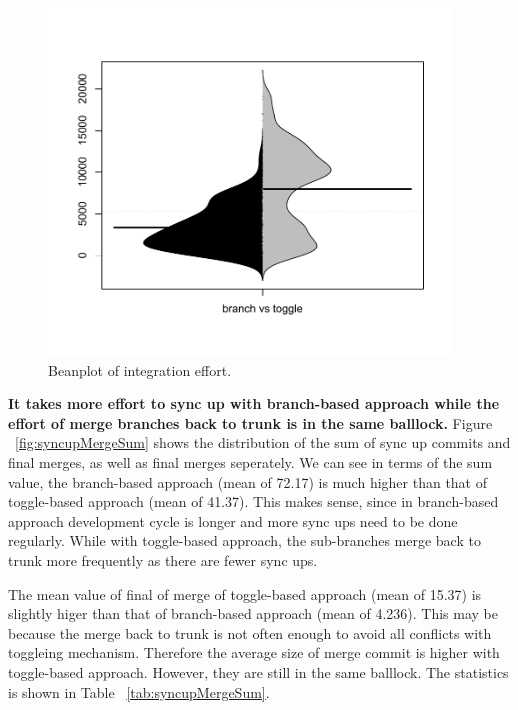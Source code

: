 \begin{figure}
\includegraphics[width=0.95\textwidth]{figure/beforeAfterIE.pdf}
\caption{Beanplot of integration effort.}
\label{fig:integrationEffort}
\end{figure}


\textbf{It takes more effort to sync up with branch-based approach while the effort of merge branches back to trunk is in the same balllock.} Figure ~\ref{fig:syncupMergeSum} shows the distribution of the sum of sync up commits and final merges, as well as final merges seperately. We can see in terms of the sum value, the branch-based approach (mean of 72.17) is much higher than that of toggle-based approach (mean of 41.37). This makes sense, since in branch-based approach development cycle is longer and more sync ups need to be done regularly. While with toggle-based approach, the sub-branches merge back to trunk more frequently as there are fewer sync ups.

The mean value of final of merge of toggle-based approach (mean of 15.37) is slightly higer than that of branch-based approach (mean of 4.236). This may be because the merge back to trunk is not often enough to avoid all conflicts with toggleing mechanism. Therefore the average size of merge commit is higher with toggle-based approach. However, they are still in the same balllock. The statistics is shown in Table ~\ref{tab:syncupMergeSum}.


